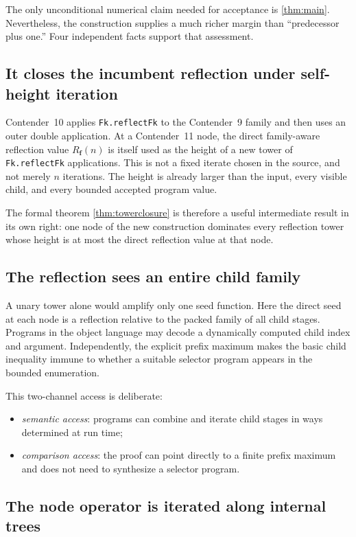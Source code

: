 \documentclass[11pt]{article}
\theoremstyle{definition}
\theoremstyle{remark}
\newcommand{\Rfam}{\ensuremath{R_{\mathbf f}}}
\newcommand{\code}[1]{\texttt{#1}}
\begin{document}
The only unconditional numerical claim needed for acceptance is
\cref{thm:main}. Nevertheless, the construction supplies a much richer margin
than ``predecessor plus one.'' Four independent facts support that assessment.

\subsection{It closes the incumbent reflection under self-height iteration}

Contender~10 applies \code{Fk.reflectFk} to the Contender~9 family and then uses
an outer double application. At a Contender~11 node, the direct family-aware
reflection value $\Rfam(n)$ is itself used as the height of a new tower of
\code{Fk.reflectFk} applications. This is not a fixed iterate chosen in the
source, and not merely $n$ iterations. The height is already larger than the
input, every visible child, and every bounded accepted program value.

The formal theorem \cref{thm:towerclosure} is therefore a useful intermediate
result in its own right: one node of the new construction dominates every
reflection tower whose height is at most the direct reflection value at that
node.

\subsection{The reflection sees an entire child family}

A unary tower alone would amplify only one seed function. Here the direct seed
at each node is a reflection relative to the packed family of all child
stages. Programs in the object language may decode a dynamically computed
child index and argument. Independently, the explicit prefix maximum makes the
basic child inequality immune to whether a suitable selector program appears
in the bounded enumeration.

This two-channel access is deliberate:
\begin{itemize}[leftmargin=*]
\item \emph{semantic access}: programs can combine and iterate child stages in
  ways determined at run time;
\item \emph{comparison access}: the proof can point directly to a finite prefix
  maximum and does not need to synthesize a selector program.
\end{itemize}

\subsection{The node operator is iterated along internal trees}
\end{document}
